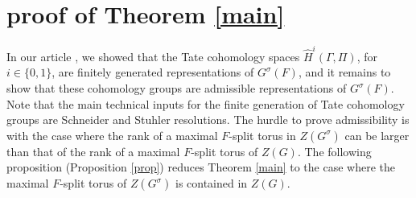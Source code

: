 \documentclass[10pt, reqno]{amsart}
\theoremstyle{plain}
\numberwithin{equation}{section}
\begin{document}
\section{proof of Theorem \ref{main}}
In our article \cite[Theorem
2.3]{dhar2025jacquetmodulestatecohomology}, we showed that the Tate
cohomology spaces $\widehat{H}^i(\Gamma, \Pi)$, for $i\in\{0,1\}$, are
finitely generated representations of $G^\sigma(F)$, and it remains to
show that these cohomology groups are admissible representations of
$G^\sigma(F)$.  Note that the main technical inputs for the finite
generation of Tate cohomology groups are Schneider and Stuhler
resolutions.  The hurdle to prove admissibility is with the case where
the rank of a maximal $F$-split torus in $Z(G^\sigma)$ can be larger
than that of the rank of a maximal $F$-split torus of $Z(G)$. The
following proposition (Proposition \ref{prop}) reduces Theorem
\ref{main} to the case where the maximal $F$-split torus of
$Z(G^\sigma)$ is contained in $Z(G)$.
 
\end{document}
